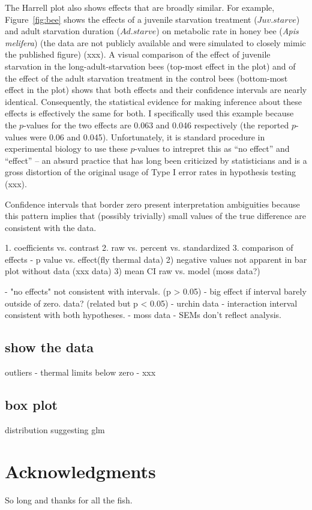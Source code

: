 \documentclass[fleqn,10pt,lineno]{wlpeerj} %
\begin{document}
The Harrell plot also shows effects that are broadly similar. For example, Figure~\ref{fig:bee} shows the effects of a juvenile starvation treatment ($Juv.starve$) and adult starvation duration ($Ad.starve$) on metabolic rate in honey bee (\textit{Apis melifera}) (the data are not publicly available and were simulated to closely mimic the published figure) (xxx). A visual comparison of the effect of juvenile starvation in the long-adult-starvation bees (top-most effect in the plot) and of the effect of the adult starvation treatment in the control bees (bottom-most effect in the plot) shows that both effects and their confidence intervals are nearly identical. Consequently, the statistical evidence for making inference about these effects is effectively the same for both. I specifically used this example because the $p$-values for the two effects are 0.063 and 0.046 respectively (the reported $p$-values were 0.06 and 0.045). Unfortunately, it is standard procedure in experimental biology to use these $p$-values to intrepret this as ``no effect'' and ``effect'' -- an absurd practice that has long been criticized by statisticians and is a gross distortion of the original usage of Type I error rates in hypothesis testing (xxx). 

Confidence intervals that border zero present interpretation ambiguities because this pattern implies that (possibly trivially) small values of the true difference are consistent with the data.

1. coefficients vs. contrast
2. raw vs. percent vs. standardized
3. comparison of effects  - p value vs. effect(fly thermal data)
2) negative values not apparent in bar plot without data (xxx data)
3) mean CI raw vs. model (moss data?)

- "no effects" not consistent with intervals. (p > 0.05)
- big effect if interval barely outside of zero. data? (related but p < 0.05)
- urchin data - interaction interval consistent with both hypotheses.
- moss data - SEMs don't reflect analysis.


\subsection*{show the data}
outliers - thermal limits
below zero - xxx

\subsection*{box plot}
distribution suggesting glm




\section*{Acknowledgments}

So long and thanks for all the fish.


\end{document}
